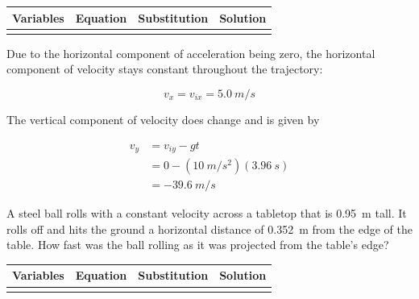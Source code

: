 \documentclass[../main-physics-workbook.tex]{subfiles}
\begin{document}
\begin{questions}
\begin{parts}
\begin{center}
\begin{table}[h!]
\centering
\renewcommand{\arraystretch}{1.2} %
\setlength{\extrarowheight}{0pt}  %
\begin{tabular}{|>{\centering\arraybackslash}m{3cm}|>{\centering\arraybackslash}m{4cm}|>{\centering\arraybackslash}m{4.5cm}|>{\centering\arraybackslash}m{3cm}|} 
\hline
\textbf{Variables} & \textbf{Equation} & \textbf{Substitution} & \textbf{Solution} \\
\hline
\rule{0pt}{4.5cm} & & & \\
\hline
\end{tabular}
\end{table}
\end{center}

\begin{solution}
Due to the horizontal component of acceleration being zero, the horizontal component of velocity stays constant throughout the trajectory:

\begin{equation*}
    \boxed{v_{x} = v_{ix} = \SI{5.0}{m/s}}
\end{equation*}

The vertical component of velocity does change and is given by

\begin{align*}
    v_y &= v_{iy} - gt \\[1ex]
    &= 0 - \left(\SI{10}{m/s^2}\right)(\SI{3.96}{s}) \\[1ex]
    &= \boxed{-\SI{39.6}{m/s}}
\end{align*}
\end{solution}
\end{parts}

\question
A steel ball rolls with a constant velocity across a tabletop that is \SI{0.95}{m} tall. It rolls off and hits the ground a horizontal distance of \SI{0.352}{m} from the edge of the table. How fast was the ball rolling as it was projected from the table's edge?

\begin{center}
\begin{table}[h!]
\centering
\renewcommand{\arraystretch}{1.2} %
\setlength{\extrarowheight}{0pt}  %
\begin{tabular}{|>{\centering\arraybackslash}m{3cm}|>{\centering\arraybackslash}m{4cm}|>{\centering\arraybackslash}m{4.5cm}|>{\centering\arraybackslash}m{3cm}|} 
\hline
\textbf{Variables} & \textbf{Equation} & \textbf{Substitution} & \textbf{Solution} \\
\hline
\rule{0pt}{4cm} & & & \\
\hline
\end{tabular}
\end{table}
\vspace{-2em}
\end{center}


\end{questions}
\end{document}
